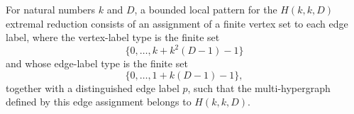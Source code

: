 \begin{definition}
For natural numbers $k$ and $D$, a bounded local pattern for the
$H(k,k,D)$ extremal reduction consists of an assignment of a finite vertex
set to each edge label, where the vertex-label type is the finite set
\[
\{0,\ldots,k+k^2(D-1)-1\}
\]
and whose edge-label type is the finite set
\[
\{0,\ldots,1+k(D-1)-1\},
\]
together with a distinguished edge label $p$, such that the multi-hypergraph
defined by this edge assignment belongs to $H(k,k,D)$.
\end{definition}
